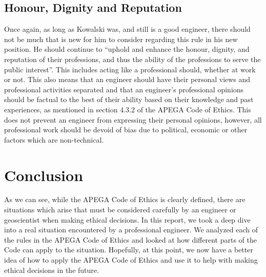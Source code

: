 \documentclass[letterpaper,12pt]{article}
\begin{document}
\subsection{Honour, Dignity and Reputation}
Once again, as long as Kowalski was, and still is a good engineer, there should not be much that is new for him to consider regarding this rule
in his new position. He should continue to ``uphold and enhance the honour, dignity,
and reputation of their professions, and thus the ability of the professions to serve the
public interest''\cite{apegacode}. This includes acting like a professional should, whether at work or not.
This also means that an engineer should have their personal views and professional activities separated and that an
engineer's professional opinions should be factual to the best of their ability based on their knowledge and past experiences,
as mentioned in section 4.3.2 of the APEGA Code of Ethics\cite{apegacode}. This does not prevent an engineer from expressing their
personal opinions, however, all professional work should be devoid of bias due to political, economic or other factors which are
non-technical.

\section{Conclusion}
As we can see, while the APEGA Code of Ethics is clearly defined, there are situations which arise that must be considered carefully by an engineer or
geoscientist when making ethical decisions. In this report, we took a deep dive into a real situation encountered by a professional engineer.
We analyzed each of the rules in the APEGA Code of Ethics and looked at how different parts of the Code can apply to the situation.
Hopefully, at this point, we now have a better idea of how to apply the APEGA Code of Ethics and use it to help with making
ethical decisions in the future.


\singlespacing
\nocite{*}
\printbibliography
\end{document}
